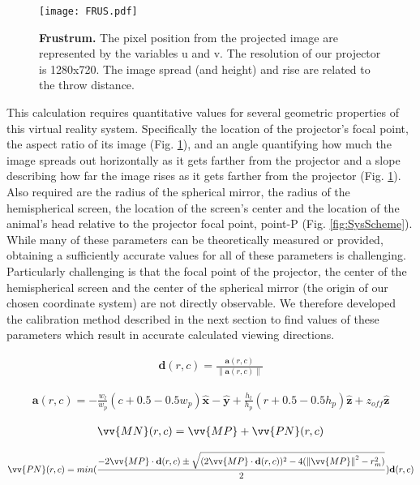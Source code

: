 \documentclass[10pt,letterpaper]{article}
\newcommand{\norm}[1]{\left\lVert#1\right\rVert}
\renewcommand{\vector}[1]{\mathbf{#1}}
\newcommand{\uvector}[1]{\mathbf{\hat{#1}}}
\begin{document}
\begin{figure}[h]
\centering
\texttt{[image: FRUS.pdf]}
\caption{{\bf Frustrum.}
The pixel position from the projected image are represented by the variables u and v. The resolution of our projector is 1280x720. The image spread (and height) and rise are related to the throw distance.}
\label{fig:FRUS}
\end{figure}
This calculation requires quantitative values for several geometric properties
of this virtual reality system. Specifically the location of the projector's
focal point, the aspect ratio of its image (Fig. \ref{fig:FRUS}), and an angle
quantifying how much the image spreads out horizontally as it gets farther from
the projector and a slope describing how far the image rises as it gets farther
from the projector (Fig. \ref{fig:FRUS}). Also required are the radius of the
spherical mirror, the radius of the hemispherical screen, the location of the
screen's center and the location of the animal's head relative to the projector
focal point, point-P (Fig. \ref{fig:SysScheme}). While many of these parameters
can be theoretically measured or provided, obtaining a sufficiently accurate
values for all of these parameters is challenging.  Particularly challenging is
that the focal point of the projector, the center of the hemispherical screen
and the center of the spherical mirror (the origin of our chosen coordinate
system) are not directly observable. We therefore developed the calibration
method described in the next section to find values of these parameters which
result in accurate calculated viewing directions.

\begin{eqnarray}
\label{eq:1}
  \vector{d}(r,c) = \frac{\vector{a}(r,c)}{\norm{\vector{a}(r,c)}}
\end{eqnarray}

\begin{eqnarray}
\label{eq:2}
  \vector{a}(r,c) = -\frac{w_l}{w_p}(c + 0.5 - 0.5w_p)\uvector{x} -\uvector{y} 
   + \frac{h_l}{h_p}(r + 0.5 - 0.5h_p)\uvector{z} + z_{off}\uvector{z}
\end{eqnarray}

\begin{eqnarray}
\label{eq:3}
  \vv{MN}(r,c) = \vv{MP} + \vv{PN}(r,c)
\end{eqnarray}

\begin{eqnarray}
\label{eq:4}
  \vv{PN}(r,c) = min(\frac{-2\vv{MP}\cdot\vector{d}(r,c)\pm
        \sqrt{(2\vv{MP}\cdot\vector{d}(r,c))^2 - 4(\norm{\vv{MP}}^2 -
        r_m^2)}}{2})\vector{d}(r,c)
\end{eqnarray}
\end{document}
